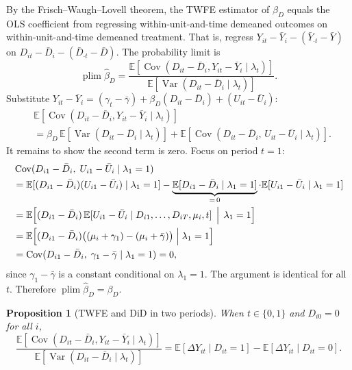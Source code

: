 \documentclass[12pt,a4paper]{article}
\theoremstyle{plain}
\newtheorem{propositio}{Proposition}[section]
\theoremstyle{definition}
\renewenvironment{proof}{\pushQED{\qed}\normalfont}{\popQED\par\nobreak}
\newcommand{\E}{\mathbb{E}}
\newcommand{\Cov}{\operatorname{Cov}}
\newcommand{\Var}{\operatorname{Var}}
\newcommand{\plim}{\operatorname{plim}}
\begin{document}
\begin{proof}
By the Frisch--Waugh--Lovell theorem, the TWFE estimator of $\beta_D$ equals the OLS coefficient from regressing within-unit-and-time demeaned outcomes on within-unit-and-time demeaned treatment.
That is, regress $Y_{it}-\bar Y_i-(\bar Y_{\cdot t}-\bar Y)$ on $D_{it}-\bar D_i-(\bar D_{\cdot t}-\bar D)$.
The probability limit is
\[
  \plim\hat\beta_D
  = \frac{\E[\Cov(D_{it}-\bar D_i,Y_{it}-\bar Y_i\mid\lambda_t)]}
         {\E[\Var(D_{it}-\bar D_i\mid\lambda_t)]}.
\]
Substitute $Y_{it}-\bar Y_i = (\gamma_t-\bar\gamma)+\beta_D(D_{it}-\bar D_i)+(U_{it}-\bar U_i)$:
\begin{align*}
  &\E[\Cov(D_{it}-\bar D_i,Y_{it}-\bar Y_i\mid\lambda_t)]\\
  &= \beta_D\,\E[\Var(D_{it}-\bar D_i\mid\lambda_t)]
     + \E[\Cov(D_{it}-\bar D_i,\,U_{it}-\bar U_i\mid\lambda_t)].
\end{align*}
It remains to show the second term is zero.  Focus on period $t=1$:
\begin{align*}
  &\Cov(D_{i1}-\bar D_i,\;U_{i1}-\bar U_i\mid\lambda_1=1)\\
  &= \E[(D_{i1}-\bar D_i)(U_{i1}-\bar U_i)\mid\lambda_1=1]
     - \underbrace{\E[D_{i1}-\bar D_i\mid\lambda_1=1]}_{=\,0}\cdot\E[U_{i1}-\bar U_i\mid\lambda_1=1]\\
  &= \E\!\left[(D_{i1}-\bar D_i)\,\E[U_{i1}-\bar U_i\mid D_{i1},\ldots,D_{iT},\mu_i,t]\,\Bigm|\,\lambda_1=1\right]\\
  &= \E\!\left[(D_{i1}-\bar D_i)\bigl((\mu_i+\gamma_1)-(\mu_i+\bar\gamma)\bigr)\Bigm|\lambda_1=1\right]\\
  &= \Cov(D_{i1}-\bar D_i,\;\gamma_1-\bar\gamma\mid\lambda_1=1) = 0,
\end{align*}
since $\gamma_1-\bar\gamma$ is a constant conditional on $\lambda_1=1$.  The argument is identical for all $t$.  Therefore $\plim\hat\beta_D=\beta_D$.
\end{proof}

\begin{propositio}[TWFE and DiD in two periods\label{prop:twfe_did}]
When $t\in\{0,1\}$ and $D_{i0}=0$ for all $i$,
\[
  \frac{\E[\Cov(D_{it}-\bar D_i,Y_{it}-\bar Y_i\mid\lambda_t)]}
       {\E[\Var(D_{it}-\bar D_i\mid\lambda_t)]}
  = \E[\Delta Y_{it}\mid D_{it}=1]-\E[\Delta Y_{it}\mid D_{it}=0].
\]
\end{propositio}
\end{document}
